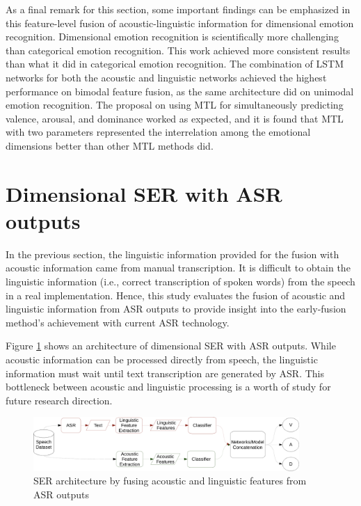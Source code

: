 As a final remark for this section, some important findings can be emphasized
in this feature-level fusion of acoustic-linguistic information for dimensional
emotion recognition. Dimensional emotion recognition is scientifically more
challenging than categorical emotion recognition. This work achieved more
consistent results than what it did in categorical emotion recognition. The
combination of LSTM networks for both the acoustic and linguistic networks
achieved the highest performance on bimodal feature fusion, as the same
architecture did on unimodal emotion recognition.  The proposal on using MTL
for simultaneously predicting valence, arousal, and dominance worked as
expected, and it is found that MTL with two parameters represented the
interrelation among the emotional dimensions better than other MTL methods did.


\section{Dimensional SER with ASR outputs}
In the previous section, the linguistic information provided for the fusion
with acoustic information came from manual transcription. It is difficult to
obtain the linguistic information (i.e., correct transcription of spoken words)
from the speech in a real implementation. Hence, this study evaluates the
fusion of acoustic and linguistic information from ASR outputs to provide
insight into the early-fusion method's achievement with current ASR technology.

Figure \ref{fig:ser_asr} shows an architecture of dimensional SER with ASR
outputs. While acoustic information can be processed directly from speech, the
linguistic information must wait until text transcription are generated by ASR.
This bottleneck between acoustic and linguistic processing is a worth of study
for future research direction.
\begin{figure}[htbp]
  \centering
  \includegraphics[width=0.9\textwidth]{../fig/ser_asr-crop.pdf}
  \caption{SER architecture by fusing acoustic and linguistic features from ASR outputs}
  \label{fig:ser_asr}
\end{figure}

